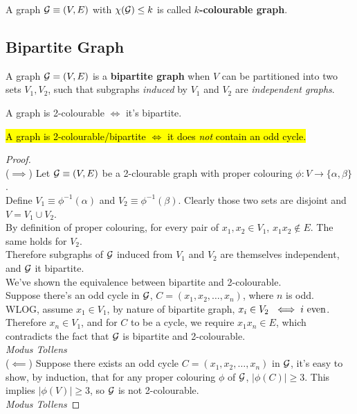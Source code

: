 \documentclass{article}
\begin{document}
			\begin{definition}
				A graph $\mathcal{{G}} \equiv (V, E)$ with $\chi(\mathcal{{G}}) \leq k$ is called \textbf{$k$-colourable graph}.
			\end{definition}
			
		\subsection{Bipartite Graph}
			\begin{definition}
				A graph $\mathcal{{G}} = (V, E)$ is a \textbf{bipartite graph} when $V$ can be partitioned into two sets $V_1, V_2$, such that subgraphs \emph{induced} by $V_1$ and $V_2$ are \emph{independent graphs}.
			\end{definition}
			
			\begin{theorem}
				A graph is 2-colourable $\iff$ it's bipartite.
			\end{theorem}
			
			\begin{theorem}
				\hl{A graph is 2-colourable/bipartite $\iff$ it does \emph{not} contain an odd cycle.}
			\end{theorem}
			\begin{proof}\quad \\
				($\implies$) Let $\mathcal{{G}} \equiv (V, E)$ be a 2-clourable graph with proper colouring $\phi: V \to \{\alpha, \beta\}$. \\
				Define $V_1 \equiv \phi^{-1}(\alpha)$ and $V_2 \equiv \phi^{-1}(\beta)$. Clearly those two sets are disjoint and $V = V_1 \cup V_2$. \\
				By definition of proper colouring, for every pair of $x_1, x_2 \in V_1$, $x_1 x_2 \notin E$. The same holds for $V_2$. \\
				Therefore subgraphs of $\mathcal{{G}}$ induced from $V_1$ and $V_2$ are themselves independent, and $\mathcal{{G}}$ it bipartite. \\
				We've shown the equivalence between bipartite and 2-colourable. \\
				Suppose there's an odd cycle in $\mathcal{{G}}$, $C = (x_1, x_2, \dots, x_n)$, where $n$ is odd. \\
				WLOG, assume $x_1 \in V_1$, by nature of bipartite graph, $x_i \in V_2\ \iff i \tx{ even}$. Therefore $x_n \in V_1$, and for $C$ to be a cycle, we require $x_1 x_n \in E$, which contradicts the fact that $\mathcal{{G}}$ is bipartite and 2-colourable. \\\emph{Modus Tollens} \\
				($\impliedby$) Suppose there exists an odd cycle $C = (x_1, x_2, \dots, x_n)$ in $\mathcal{{G}}$, it's easy to show, by induction,  that for any proper colouring $\phi$ of $\mathcal{{G}}$, $|\phi(C)| \geq 3$. This implies $|\phi(V)| \geq 3$, so $\mathcal{{G}}$ is not 2-colourable. \\
				\emph{Modus Tollens}
			\end{proof}
			
\end{document}
